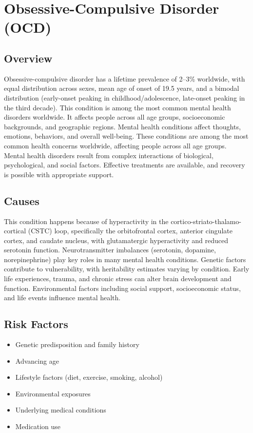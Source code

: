 \chapter{Obsessive-Compulsive Disorder (OCD)}
\label{sec:Obsessive-Compulsive Disorder (OCD)}

\section{Overview}
Obsessive-compulsive disorder has a lifetime prevalence of 2--3\% worldwide, with equal distribution across sexes, mean age of onset of 19.5 years, and a bimodal distribution (early-onset peaking in childhood/adolescence, late-onset peaking in the third decade). This condition is among the most common mental health disorders worldwide. It affects people across all age groups, socioeconomic backgrounds, and geographic regions. Mental health conditions affect thoughts, emotions, behaviors, and overall well-being. These conditions are among the most common health concerns worldwide, affecting people across all age groups. Mental health disorders result from complex interactions of biological, psychological, and social factors. Effective treatments are available, and recovery is possible with appropriate support.
\section{Causes}
This condition happens because of hyperactivity in the cortico-striato-thalamo-cortical (CSTC) loop, specifically the orbitofrontal cortex, anterior cingulate cortex, and caudate nucleus, with glutamatergic hyperactivity and reduced serotonin function.  Neurotransmitter imbalances (serotonin, dopamine, norepinephrine) play key roles in many mental health conditions. Genetic factors contribute to vulnerability, with heritability estimates varying by condition. Early life experiences, trauma, and chronic stress can alter brain development and function. Environmental factors including social support, socioeconomic status, and life events influence mental health.   
\section{Risk Factors}
\begin{itemize}[noitemsep]
  \item Genetic predisposition and family history
  \item Advancing age
  \item Lifestyle factors (diet, exercise, smoking, alcohol)
  \item Environmental exposures
  \item Underlying medical conditions
  \item Medication use
\end{itemize}

